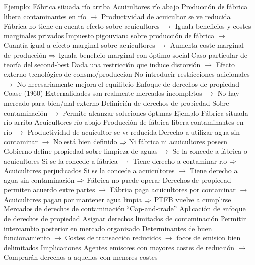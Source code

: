 \documentclass{nuevotema}
\begin{document}
\begin{esquemal}
				\4[] 
				\4 Ejemplo:
				\4[] Fábrica situada río arriba
				\4[] Acuicultores río abajo
				\4[] Producción de fábrica libera contaminantes en río
				\4[] $\to$ Productividad de acuicultor se ve reducida
				\4[] Fábrica no tiene en cuenta efecto sobre acuicultores
				\4[] $\to$ Iguala beneficios y costes marginales privados
				\4[] Impuesto pigouviano sobre producción de fábrica
				\4[] $\to$ Cuantía igual a efecto marginal sobre acuicultores
				\4[] $\to$ Aumenta coste marginal de producción
				\4[] $\Rightarrow$ Iguala beneficio marginal con óptimo social
				\4 Caso particular de teoría del second-best
				\4[] Dada una restricción que induce distorsión
				\4[] $\to$ Efecto externo tecnológico de consmo/producción
				\4[] No introducir restricciones adicionales
				\4[] $\to$ No necesariamente mejora el equilibrio
			\3 Enfoque de derechos de propiedad
				\4 Coase (1960)
				\4[] Externalidades son realmente mercados incompletos
				\4[] $\to$ No hay mercado para bien/mal externo
				\4 Definición de derechos de propiedad
				\4[] Sobre contaminación
				\4[] $\to$ Permite alcanzar soluciones óptimas
				\4 Ejemplo
				\4[] Fábrica situada río arriba
				\4[] Acuicultores río abajo
				\4[] Producción de fábrica libera contaminantes en río
				\4[] $\to$ Productividad de acuicultor se ve reducida
				\4[] Derecho a utilizar agua sin contaminar
				\4[] $\to$ No está bien definido
				\4[] $\Rightarrow$ Ni fábrica ni acuicultores poseen
				\4[] Gobierno define propiedad sobre limpieza de aguas
				\4[] $\to$ Se la concede a fábrica o acuicultores
				\4[] Si se la concede a fábrica
				\4[] $\to$ Tiene derecho a contaminar río
				\4[] $\Rightarrow$ Acuicultores perjudicados
				\4[] Si se la concede a acuicultores
				\4[] $\to$ Tiene derecho a agua sin contaminación
				\4[] $\Rightarrow$ Fábrica no puede operar
				\4[] Derechos de propiedad permiten acuerdo entre partes
				\4[] $\to$ Fábrica paga acuicultores por contaminar
				\4[] $\to$ Acuicultores pagan por mantener agua limpia
				\4[] $\Rightarrow$ PTFB vuelve a cumplirse
			\3 Mercados de derechos de contaminación
				\4 ``Cap-and-trade''
				\4 Aplicación de enfoque de derechos de propiedad
				\4 Asignar derechos limitados de contaminación
				\4 Permitir intercambio posterior en mercado organizado
				\4 Determinantes de buen funcionamiento
				\4[] $\to$ Costes de transacción reducidos
				\4[] $\to$ focos de emisión bien delimitados
				\4 Implicaciones
				\4[] Agentes emisores con mayores costes de reducción
				\4[] $\to$ Comprarán derechos a aquellos con menores costes

\end{esquemal}
\end{document}
